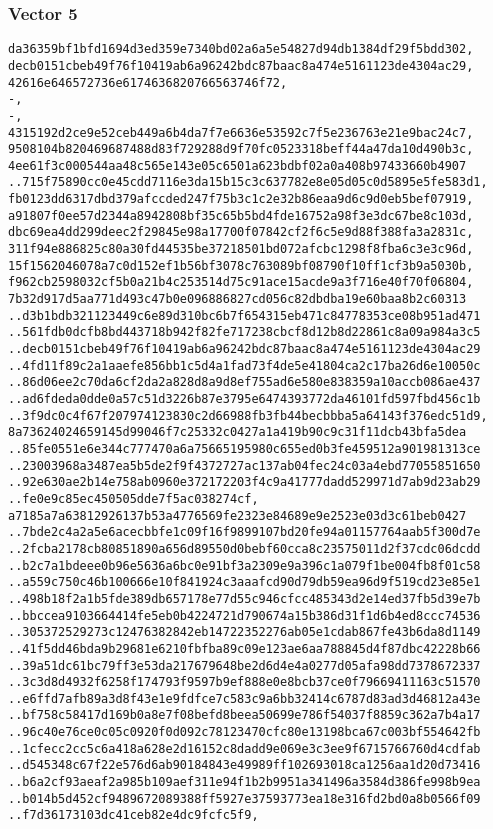 \documentclass[
]{article}
\begin{document}
\subsubsection{Vector 5}\label{vector-5-2}

\begin{verbatim}
da36359bf1bfd1694d3ed359e7340bd02a6a5e54827d94db1384df29f5bdd302,
decb0151cbeb49f76f10419ab6a96242bdc87baac8a474e5161123de4304ac29,
42616e646572736e6174636820766563746f72,
-,
-,
4315192d2ce9e52ceb449a6b4da7f7e6636e53592c7f5e236763e21e9bac24c7,
9508104b820469687488d83f729288d9f70fc0523318beff44a47da10d490b3c,
4ee61f3c000544aa48c565e143e05c6501a623bdbf02a0a408b97433660b4907
..715f75890cc0e45cdd7116e3da15b15c3c637782e8e05d05c0d5895e5fe583d1,
fb0123dd6317dbd379afccded247f75b3c1c2e32b86eaa9d6c9d0eb5bef07919,
a91807f0ee57d2344a8942808bf35c65b5bd4fde16752a98f3e3dc67be8c103d,
dbc69ea4dd299deec2f29845e98a17700f07842cf2f6c5e9d88f388fa3a2831c,
311f94e886825c80a30fd44535be37218501bd072afcbc1298f8fba6c3e3c96d,
15f1562046078a7c0d152ef1b56bf3078c763089bf08790f10ff1cf3b9a5030b,
f962cb2598032cf5b0a21b4c253514d75c91ace15acde9a3f716e40f70f06804,
7b32d917d5aa771d493c47b0e096886827cd056c82dbdba19e60baa8b2c60313
..d3b1bdb321123449c6e89d310bc6b7f654315eb471c84778353ce08b951ad471
..561fdb0dcfb8bd443718b942f82fe717238cbcf8d12b8d22861c8a09a984a3c5
..decb0151cbeb49f76f10419ab6a96242bdc87baac8a474e5161123de4304ac29
..4fd11f89c2a1aaefe856bb1c5d4a1fad73f4de5e41804ca2c17ba26d6e10050c
..86d06ee2c70da6cf2da2a828d8a9d8ef755ad6e580e838359a10accb086ae437
..ad6fdeda0dde0a57c51d3226b87e3795e6474393772da46101fd597fbd456c1b
..3f9dc0c4f67f207974123830c2d66988fb3fb44becbbba5a64143f376edc51d9,
8a73624024659145d99046f7c25332c0427a1a419b90c9c31f11dcb43bfa5dea
..85fe0551e6e344c777470a6a75665195980c655ed0b3fe459512a901981313ce
..23003968a3487ea5b5de2f9f4372727ac137ab04fec24c03a4ebd77055851650
..92e630ae2b14e758ab0960e372172203f4c9a41777dadd529971d7ab9d23ab29
..fe0e9c85ec450505dde7f5ac038274cf,
a7185a7a63812926137b53a4776569fe2323e84689e9e2523e03d3c61beb0427
..7bde2c4a2a5e6acecbbfe1c09f16f9899107bd20fe94a01157764aab5f300d7e
..2fcba2178cb80851890a656d89550d0bebf60cca8c23575011d2f37cdc06dcdd
..b2c7a1bdeee0b96e5636a6bc0e91bf3a2309e9a396c1a079f1be004fb8f01c58
..a559c750c46b100666e10f841924c3aaafcd90d79db59ea96d9f519cd23e85e1
..498b18f2a1b5fde389db657178e77d55c946cfcc485343d2e14ed37fb5d39e7b
..bbccea9103664414fe5eb0b4224721d790674a15b386d31f1d6b4ed8ccc74536
..305372529273c12476382842eb14722352276ab05e1cdab867fe43b6da8d1149
..41f5dd46bda9b29681e6210fbfba89c09e123ae6aa788845d4f87dbc42228b66
..39a51dc61bc79ff3e53da217679648be2d6d4e4a0277d05afa98dd7378672337
..3c3d8d4932f6258f174793f9597b9ef888e0e8bcb37ce0f79669411163c51570
..e6ffd7afb89a3d8f43e1e9fdfce7c583c9a6bb32414c6787d83ad3d46812a43e
..bf758c58417d169b0a8e7f08befd8beea50699e786f54037f8859c362a7b4a17
..96c40e76ce0c05c0920f0d092c78123470cfc80e13198bca67c003bf554642fb
..1cfecc2cc5c6a418a628e2d16152c8dadd9e069e3c3ee9f6715766760d4cdfab
..d545348c67f22e576d6ab90184843e49989ff102693018ca1256aa1d20d73416
..b6a2cf93aeaf2a985b109aef311e94f1b2b9951a341496a3584d386fe998b9ea
..b014b5d452cf9489672089388ff5927e37593773ea18e316fd2bd0a8b0566f09
..f7d36173103dc41ceb82e4dc9fcfc5f9,
\end{verbatim}
\end{document}

